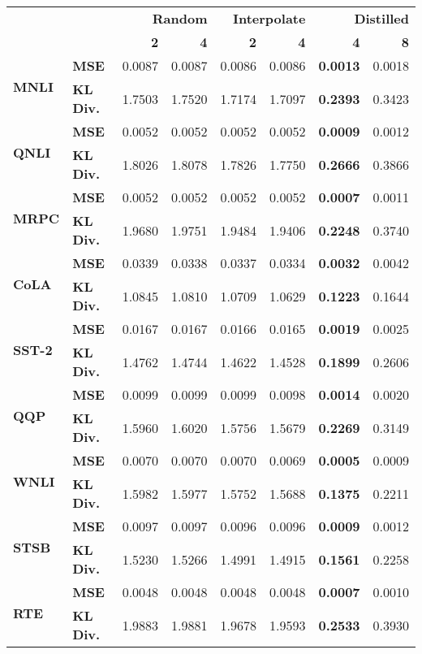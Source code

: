 \begin{tabular}{llrrrrrr}
 &  & \multicolumn{2}{r}{\bfseries Random} & \multicolumn{2}{r}{\bfseries Interpolate} & \multicolumn{2}{r}{\bfseries Distilled} \\
 &  & \bfseries 2 & \bfseries 4 & \bfseries 2 & \bfseries 4 & \bfseries 4 & \bfseries 8 \\
\multirow[c]{2}{*}{\bfseries MNLI} & \bfseries MSE & 0.0087 & 0.0087 & 0.0086 & 0.0086 & \bfseries 0.0013 & 0.0018 \\
\bfseries  & \bfseries KL Div. & 1.7503 & 1.7520 & 1.7174 & 1.7097 & \bfseries 0.2393 & 0.3423 \\
\multirow[c]{2}{*}{\bfseries QNLI} & \bfseries MSE & 0.0052 & 0.0052 & 0.0052 & 0.0052 & \bfseries 0.0009 & 0.0012 \\
\bfseries  & \bfseries KL Div. & 1.8026 & 1.8078 & 1.7826 & 1.7750 & \bfseries 0.2666 & 0.3866 \\
\multirow[c]{2}{*}{\bfseries MRPC} & \bfseries MSE & 0.0052 & 0.0052 & 0.0052 & 0.0052 & \bfseries 0.0007 & 0.0011 \\
\bfseries  & \bfseries KL Div. & 1.9680 & 1.9751 & 1.9484 & 1.9406 & \bfseries 0.2248 & 0.3740 \\
\multirow[c]{2}{*}{\bfseries CoLA} & \bfseries MSE & 0.0339 & 0.0338 & 0.0337 & 0.0334 & \bfseries 0.0032 & 0.0042 \\
\bfseries  & \bfseries KL Div. & 1.0845 & 1.0810 & 1.0709 & 1.0629 & \bfseries 0.1223 & 0.1644 \\
\multirow[c]{2}{*}{\bfseries SST-2} & \bfseries MSE & 0.0167 & 0.0167 & 0.0166 & 0.0165 & \bfseries 0.0019 & 0.0025 \\
\bfseries  & \bfseries KL Div. & 1.4762 & 1.4744 & 1.4622 & 1.4528 & \bfseries 0.1899 & 0.2606 \\
\multirow[c]{2}{*}{\bfseries QQP} & \bfseries MSE & 0.0099 & 0.0099 & 0.0099 & 0.0098 & \bfseries 0.0014 & 0.0020 \\
\bfseries  & \bfseries KL Div. & 1.5960 & 1.6020 & 1.5756 & 1.5679 & \bfseries 0.2269 & 0.3149 \\
\multirow[c]{2}{*}{\bfseries WNLI} & \bfseries MSE & 0.0070 & 0.0070 & 0.0070 & 0.0069 & \bfseries 0.0005 & 0.0009 \\
\bfseries  & \bfseries KL Div. & 1.5982 & 1.5977 & 1.5752 & 1.5688 & \bfseries 0.1375 & 0.2211 \\
\multirow[c]{2}{*}{\bfseries STSB} & \bfseries MSE & 0.0097 & 0.0097 & 0.0096 & 0.0096 & \bfseries 0.0009 & 0.0012 \\
\bfseries  & \bfseries KL Div. & 1.5230 & 1.5266 & 1.4991 & 1.4915 & \bfseries 0.1561 & 0.2258 \\
\multirow[c]{2}{*}{\bfseries RTE} & \bfseries MSE & 0.0048 & 0.0048 & 0.0048 & 0.0048 & \bfseries 0.0007 & 0.0010 \\
\bfseries  & \bfseries KL Div. & 1.9883 & 1.9881 & 1.9678 & 1.9593 & \bfseries 0.2533 & 0.3930 \\
\end{tabular}
